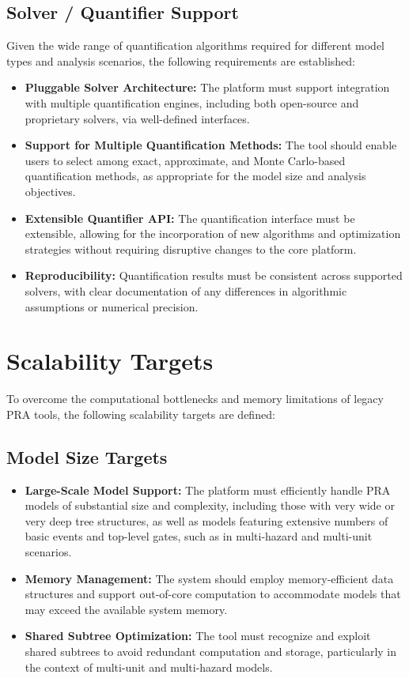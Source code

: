 \subsection{Solver / Quantifier Support}
\label{subsec:solver-support}

Given the wide range of quantification algorithms required for different model types and analysis scenarios, the following requirements are established:

\begin{itemize}
    \item \textbf{Pluggable Solver Architecture:} The platform must support integration with multiple quantification engines, including both open-source and proprietary solvers, via well-defined interfaces.
    \item \textbf{Support for Multiple Quantification Methods:} The tool should enable users to select among exact, approximate, and Monte Carlo-based quantification methods, as appropriate for the model size and analysis objectives.
    \item \textbf{Extensible Quantifier API:} The quantification interface must be extensible, allowing for the incorporation of new algorithms and optimization strategies without requiring disruptive changes to the core platform.
    \item \textbf{Reproducibility:} Quantification results must be consistent across supported solvers, with clear documentation of any differences in algorithmic assumptions or numerical precision.
\end{itemize}

\section{Scalability Targets}
\label{sec:scalability-targets}

To overcome the computational bottlenecks and memory limitations of legacy PRA tools, the following scalability targets are defined:

\subsection{Model Size Targets}
\label{subsec:model-size-targets}

\begin{itemize}
    \item \textbf{Large-Scale Model Support:} The platform must efficiently handle PRA models of substantial size and complexity, including those with very wide or very deep tree structures, as well as models featuring extensive numbers of basic events and top-level gates, such as in multi-hazard and multi-unit scenarios.
    \item \textbf{Memory Management:} The system should employ memory-efficient data structures and support out-of-core computation to accommodate models that may exceed the available system memory.
    \item \textbf{Shared Subtree Optimization:} The tool must recognize and exploit shared subtrees to avoid redundant computation and storage, particularly in the context of multi-unit and multi-hazard models.
\end{itemize}

